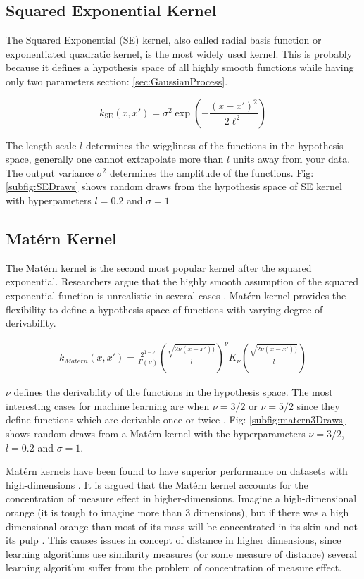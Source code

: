 \subsection{Squared Exponential Kernel}
The Squared Exponential (SE) kernel, also called radial basis function or exponentiated quadratic kernel, is the most widely used kernel. This is probably because it defines a hypothesis space of all highly smooth functions while having only two parameters section: \ref{sec:GaussianProcess}.

\begin{equation}
k_{\textrm{SE}}(x, x') = \sigma^2\exp\left(-\frac{(x - x')^2}{2\ell^2}\right)
\end{equation}

The length-scale $l$ determines the wiggliness of the functions in the hypothesis space, generally one cannot extrapolate more than $l$ units away from your data. The output variance $\sigma^{2}$ determines the amplitude of the functions. Fig: \ref{subfig:SEDraws} shows random draws from the hypothesis space of SE kernel with hyperpameters $l = 0.2$  and  $\sigma = 1$

\subsection{Mat\'ern Kernel}\label{subsec:maternKernel}
The Mat\'ern kernel is the second most popular kernel after the squared exponential. Researchers argue that the highly smooth assumption of the squared exponential function is unrealistic in several cases \cite{stein2012interpolation}. Mat\'ern kernel provides the flexibility to define a hypothesis space of functions with varying degree of derivability. 

\begin{align}
k_{Matern}(x, x') = \frac{2^{1- \nu }}{\Gamma (\nu)}\left ( \frac{\sqrt{2\nu(x-x'))}}{l} \right )^{\nu}K_{\nu}\left ( \frac{\sqrt{2\nu(x-x'))}}{l} \right)
\end{align}

$\nu$ defines the derivability of the functions in the hypothesis space. The most interesting cases for machine learning are when $\nu = 3/2$ or $\nu = 5/2$ since they define functions which are derivable once or twice \cite{rasmussen2006gaussian}. Fig: \ref{subfig:matern3Draws} shows random draws from a Mat\'ern kernel with the hyperparameters $\nu = 3/2$, $l = 0.2$ and  $\sigma = 1$. 

Mat\'ern kernels have been found to have superior performance on datasets with high-dimensions \cite{le2013fastfood}. It is argued that the Mat\'ern kernel accounts for the concentration of measure effect in higher-dimensions. Imagine a high-dimensional orange (it is tough to imagine more than 3 dimensions), but if there was a high dimensional orange than most of its mass will be concentrated in its skin and not its pulp \cite{domingos2012few}. This causes issues in concept of distance in higher dimensions, since learning algorithms use similarity measures (or some measure of distance) several learning algorithm suffer from the problem of concentration of measure effect.

